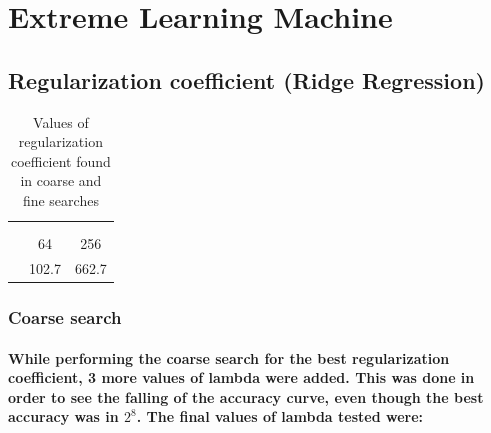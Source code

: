 \documentclass[a4paper]{article}    %
\begin{document}
\section{Extreme Learning Machine}

\setcounter{subsection}{-1}
\subsection{Regularization coefficient (Ridge Regression)}

\begin{table}[H]
    \begin{center}
        \begin{tabular}{r|c|c|} 
            \cline{2-3}
            & \multicolumn{2}{|c|}{\cellcolor[gray]{0.8}{$\lambda$ optimum}} \\
            \cline{2-3}
            & \cellcolor[gray]{0.8}{MSE} & \cellcolor[gray]{0.8}{Accuracy} \\
            \cline{1-3}
            \multicolumn{1}{|r|}{\cellcolor[gray]{0.8}{coarse search}} & 64   & 256   \\
            \cline{1-3}
            \multicolumn{1}{|r|}{\cellcolor[gray]{0.8}{fine search}}   & 102.7 & 662.7 \\
            \cline{1-3}
        \end{tabular}
    \end{center}
    \caption{Values of regularization coefficient found in coarse and fine searches}
    \label{tab:alpha_results}
\end{table}

\subsubsection{Coarse search}

\paragraph{While performing the coarse search for the best regularization coefficient, 3 more values of lambda were added. This was done in order to see the falling of the accuracy curve, even though the best accuracy was in $2^{8}$. The final values of lambda tested were:}
\end{document}
